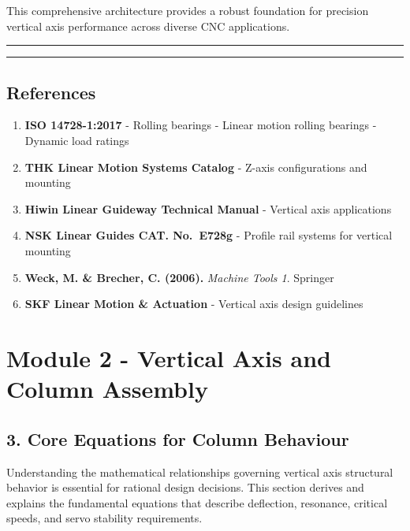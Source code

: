 \documentclass[
]{article}
\providecommand{\tightlist}{%
  \setlength{\itemsep}{0pt}\setlength{\parskip}{0pt}}
\begin{document}
This comprehensive architecture provides a robust foundation for
precision vertical axis performance across diverse CNC applications.

\begin{center}\rule{0.5\linewidth}{0.5pt}\end{center}

\begin{center}\rule{0.5\linewidth}{0.5pt}\end{center}

\subsection{References}\label{references-1}

\begin{enumerate}
\def\labelenumi{\arabic{enumi}.}
\tightlist
\item
  \textbf{ISO 14728-1:2017} - Rolling bearings - Linear motion rolling
  bearings - Dynamic load ratings
\item
  \textbf{THK Linear Motion Systems Catalog} - Z-axis configurations and
  mounting
\item
  \textbf{Hiwin Linear Guideway Technical Manual} - Vertical axis
  applications
\item
  \textbf{NSK Linear Guides CAT. No.~E728g} - Profile rail systems for
  vertical mounting
\item
  \textbf{Weck, M. \& Brecher, C. (2006).} \emph{Machine Tools 1}.
  Springer
\item
  \textbf{SKF Linear Motion \& Actuation} - Vertical axis design
  guidelines
\end{enumerate}

\newpage

\section{Module 2 - Vertical Axis and Column
Assembly}\label{module-2---vertical-axis-and-column-assembly-2}

\subsection{3. Core Equations for Column
Behaviour}\label{core-equations-for-column-behaviour}

Understanding the mathematical relationships governing vertical axis
structural behavior is essential for rational design decisions. This
section derives and explains the fundamental equations that describe
deflection, resonance, critical speeds, and servo stability
requirements.
\end{document}
